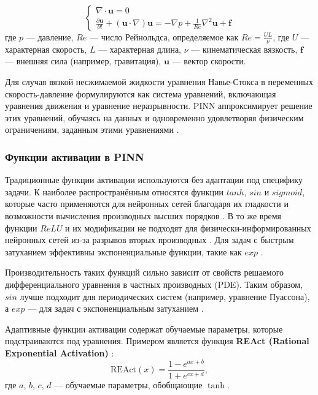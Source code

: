 \begin{equation}
    \begin{cases}
    \nabla \cdot \mathbf{u} = 0 \\
    \frac{\partial \mathbf{u}}{\partial t} + (\mathbf{u} \cdot \nabla) \mathbf{u} = -\nabla p + \frac{1}{Re} \nabla^2 \mathbf{u} + \mathbf{f}
    \end{cases}
    \label{eq:navier_stockes}
\end{equation}
где $p$ — давление, $Re$ — число Рейнольдса, определяемое как $Re = \frac{UL}{\nu}$, где $U$ —
характерная скорость, $L$ — характерная длина, $\nu$ — кинематическая вязкость, $\mathbf{f}$ —
внешняя сила (например, гравитация), $\mathbf{u}$ — вектор скорости.

Для случая вязкой несжимаемой жидкости уравнения Навье-Стокса в переменных скорость-давление формулируются
как система уравнений, включающая уравнения движения и уравнение неразрывности. PINN аппроксимирует
решение этих уравнений, обучаясь на данных и одновременно удовлетворяя физическим ограничениям, заданным
этими уравнениями \cite{jin2021nsfnets}.

\subsubsection{Функции активации в PINN}

Традиционные функции активации используются без адаптации под специфику задачи. К наиболее распространённым
относятся функции $tanh$, $sin$ и $sigmoid$, которые часто применяются для нейронных сетей благодаря их гладкости
и возможности вычисления производных высших порядков \cite{0d752c79fb816703274a3d37f85a85689a2a9405}
\cite{Sutfeld2018-io}. В то же время функции $ReLU$ и их модификации не подходят для физически-информированных нейронных сетей из-за
разрывов вторых производных \cite{fe520ccac2a6bd50f75a4a34022fe54116871013}. Для задач с быстрым затуханием
эффективны экспоненциальные функции, такие как $exp$ \cite{7fcd4b3c875d8e41eb0c184aa1a42bf4c8906d61}.

Производительность таких функций сильно зависит от свойств решаемого дифференциального уравнения в частных
производных (PDE).  Таким образом, $sin$ лучше подходит для периодических систем (например, уравнение
Пуассона), а $exp$ — для задач с экспоненциальным затуханием \cite{fe520ccac2a6bd50f75a4a34022fe54116871013}.

Адаптивные функции активации содержат обучаемые параметры, которые подстраиваются под уравнения. Примером
является функция \textbf{REAct (Rational Exponential Activation)}
\cite{0d752c79fb816703274a3d37f85a85689a2a9405}:
\begin{equation}
\text{REAct}(x) = \frac{1 - e^{ax + b}}{1 + e^{cx + d}},
\label{eq:react}
\end{equation}
где $a$, $b$, $c$, $d$ — обучаемые параметры, обобщающие $\tanh$. 

